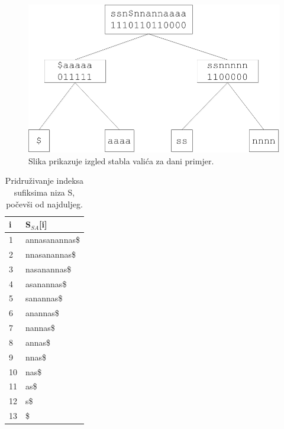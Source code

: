 \documentclass[times, utf8, seminar]{fer}
\begin{document}
\begin{figure}
	\begin{center}
		\includegraphics[width=\columnwidth]{wavelet_tree.png}
		\caption{Slika prikazuje izgled stabla valića za dani primjer.}
		\label{fig:stablo}
	\end{center}
\end{figure}

\begin{table}
\caption{Pridruživanje indeksa sufiksima niza S, počevši od najduljeg.}
\label{tablePrimjer1}
\begin{center}
\begin{tabular}{ll}
\toprule
i & S$_{SA}$[i] \\
\midrule
1 & annasanannas\$ \\
2 & nnasanannas\$ \\
3 & nasanannas\$ \\
4 & asanannas\$ \\
5 & sanannas\$ \\
6 & anannas\$ \\
7 & nannas\$ \\
8 & annas\$ \\
9 & nnas\$ \\
10 & nas\$ \\
11 & as\$ \\
12 & s\$ \\
13 & \$ \\
\bottomrule
\end{tabular}
\end{center}
\end{table}
\end{document}
